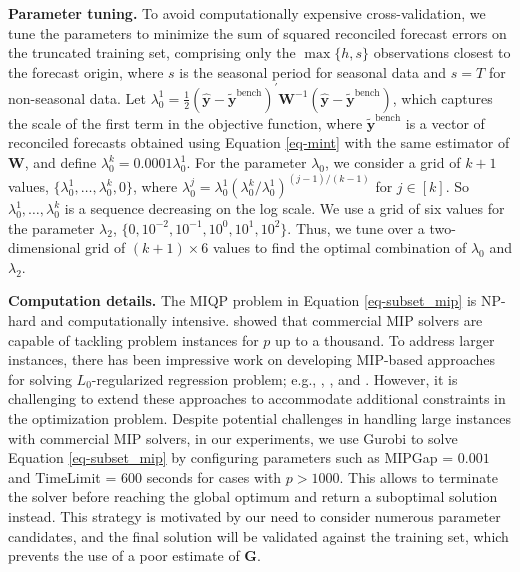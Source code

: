 \documentclass[
  11pt]{article}
\theoremstyle{plain}
\theoremstyle{remark}
\begin{document}
\textbf{Parameter tuning.} To avoid computationally expensive
cross-validation, we tune the parameters to minimize the sum of squared
reconciled forecast errors on the truncated training set, comprising
only the \(\max\{h, s\}\) observations closest to the forecast origin,
where \(s\) is the seasonal period for seasonal data and \(s=T\) for
non-seasonal data. Let
\(\lambda_{0}^{1} = \frac{1}{2}\left(\hat{\bm{y}}-\tilde{\bm{y}}^{\text{bench}}\right)^{\prime} \bm{W}^{-1}\left(\hat{\bm{y}}-\tilde{\bm{y}}^{\text{bench}}\right)\),
which captures the scale of the first term in the objective function,
where \(\tilde{\bm{y}}^{\text{bench}}\) is a vector of reconciled
forecasts obtained using Equation \eqref{eq-mint} with the same
estimator of \(\bm{W}\), and define
\(\lambda_{0}^{k} = 0.0001\lambda_{0}^{1}\). For the parameter
\(\lambda_0\), we consider a grid of \(k+1\) values,
\(\{\lambda_{0}^{1},\dots,\lambda_{0}^{k}, 0\}\), where
\(\lambda_{0}^{j} = \lambda_{0}^{1}\left(\lambda_{0}^{k} / \lambda_{0}^{1}\right)^{(j-1) / (k-1)}\)
for \(j \in [k]\). So \(\lambda_{0}^{1},\dots,\lambda_{0}^{k}\) is a
sequence decreasing on the log scale. We use a grid of six values for
the parameter \(\lambda_2\),
\(\{0, 10^{-2}, 10^{-1}, 10^{0}, 10^{1}, 10^{2}\}\). Thus, we tune over
a two-dimensional grid of \((k+1) \times 6\) values to find the optimal
combination of \(\lambda_0\) and \(\lambda_2\).

\textbf{Computation details.} The MIQP problem in Equation
\eqref{eq-subset_mip} is NP-hard and computationally intensive.
\citet{Bertsimas2016-ig} showed that commercial MIP solvers are capable
of tackling problem instances for \(p\) up to a thousand. To address
larger instances, there has been impressive work on developing MIP-based
approaches for solving \(L_0\)-regularized regression problem; e.g.,
\citet{Bertsimas2016-ig}, \citet{Hazimeh2020-xd}, and
\citet{Hazimeh2022-hc}. However, it is challenging to extend these
approaches to accommodate additional constraints in the optimization
problem. Despite potential challenges in handling large instances with
commercial MIP solvers, in our experiments, we use Gurobi to solve
Equation \eqref{eq-subset_mip} by configuring parameters such as MIPGap
= \(0.001\) and TimeLimit = \(600\) seconds for cases with \(p > 1000\).
This allows to terminate the solver before reaching the global optimum
and return a suboptimal solution instead. This strategy is motivated by
our need to consider numerous parameter candidates, and the final
solution will be validated against the training set, which prevents the
use of a poor estimate of \(\bm{G}\).
\end{document}
